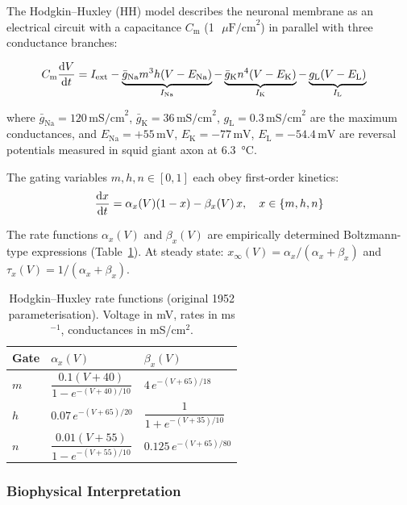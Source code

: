 \documentclass[11pt, a4paper, twocolumn]{article}
\newcommand{\EK}{\ensuremath{E_{\mathrm{K}}}}
\newcommand{\ENa}{\ensuremath{E_{\mathrm{Na}}}}
\newcommand{\EL}{\ensuremath{E_{\mathrm{L}}}}
\newcommand{\gNa}{\ensuremath{\bar{g}_{\mathrm{Na}}}}
\newcommand{\gK}{\ensuremath{\bar{g}_{\mathrm{K}}}}
\newcommand{\gL}{\ensuremath{g_{\mathrm{L}}}}
\newcommand{\Cm}{\ensuremath{C_{\mathrm{m}}}}
\newcommand{\mV}{\ensuremath{\,\mathrm{mV}}}
\newcommand{\mScm}{\ensuremath{\,\mathrm{mS/cm}^{2}}}
\newcommand{\uFcm}{\ensuremath{\,\mu\mathrm{F/cm}^{2}}}
\begin{document}
The Hodgkin--Huxley (HH) model \citep{HodgkinHuxley1952} describes the
neuronal membrane as an electrical circuit with a capacitance $\Cm$
(\SI{1}{\uFcm}) in parallel with three conductance branches:

\begin{keyequation}
\begin{align}
  \Cm \dv{V}{t} &= I_{\mathrm{ext}}
    - \underbrace{\gNa m^3 h (V - \ENa)}_{I_{\mathrm{Na}}}
    - \underbrace{\gK  n^4   (V - \EK)}_{I_{\mathrm{K}}}
    - \underbrace{\gL       (V - \EL)}_{I_{\mathrm{L}}}
    \label{eq:hh_V}
\end{align}
\end{keyequation}

where $\gNa = 120\mScm$, $\gK = 36\mScm$, $\gL = 0.3\mScm$ are the maximum
conductances, and $\ENa = +55\mV$, $\EK = -77\mV$, $\EL = -54.4\mV$ are
reversal potentials measured in squid giant axon at \SI{6.3}{\celsius}.

The gating variables $m, h, n \in [0,1]$ each obey first-order kinetics:
\begin{equation}
  \dv{x}{t} = \alpha_x(V)(1-x) - \beta_x(V)\,x, \quad x \in \{m,h,n\}
  \label{eq:gate_kinetics}
\end{equation}

The rate functions $\alpha_x(V)$ and $\beta_x(V)$ are empirically determined
Boltzmann-type expressions (Table~\ref{tab:hh_rates}). At steady state:
$x_\infty(V) = \alpha_x / (\alpha_x + \beta_x)$ and
$\tau_x(V) = 1/(\alpha_x + \beta_x)$.

\begin{table}[H]
\centering
\small
\caption{Hodgkin--Huxley rate functions (original 1952 parameterisation).
  Voltage in mV, rates in ms$^{-1}$, conductances in mS/cm$^2$.}
\label{tab:hh_rates}
\begin{tabularx}{\columnwidth}{l X X}
\toprule
\textbf{Gate} & \boldmath$\alpha_x(V)$ & \boldmath$\beta_x(V)$ \\
\midrule
$m$ & $\dfrac{0.1(V+40)}{1-e^{-(V+40)/10}}$
    & $4\,e^{-(V+65)/18}$ \\[8pt]
$h$ & $0.07\,e^{-(V+65)/20}$
    & $\dfrac{1}{1+e^{-(V+35)/10}}$ \\[8pt]
$n$ & $\dfrac{0.01(V+55)}{1-e^{-(V+55)/10}}$
    & $0.125\,e^{-(V+65)/80}$ \\
\bottomrule
\end{tabularx}
\end{table}

\subsubsection{Biophysical Interpretation}
\end{document}
